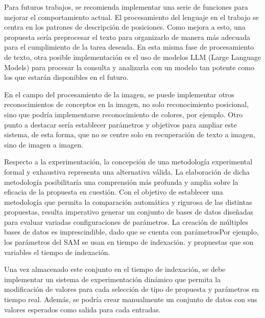 \begin{recomendations}
    Para futuros trabajos, se recomienda implementar una serie de funciones para mejorar el comportamiento actual. El procesamiento del lenguaje en el trabajo se centra en los patrones de descripción de posiciones. Como mejora a esto, una propuesta sería preprocesar el texto para organizarlo de manera más adecuada para el cumplimiento de la tarea deseada. En esta misma fase de procesamiento de texto, otra posible implementación es el uso de modelos LLM (Large Language Models) para procesar la consulta y analizarla con un modelo tan potente como los que estarán disponibles en el futuro.
    
    En el campo del procesamiento de la imagen, se puede implementar otros reconocimientos de conceptos en la imagen, no solo reconocimiento posicional, sino que podría implementarse reconocimiento de colores, por ejemplo. Otro punto a destacar sería establecer parámetros y objetivos para ampliar este sistema, de esta forma, que no se centre solo en recuperación de texto a imagen, sino de imagen a imagen.
        
    Respecto a la experimentación, la concepción de una metodología experimental formal y exhaustiva representa una alternativa v\'alida. La elaboración de dicha metodología posibilitaría una comprensión más profunda y amplia sobre la eficacia de la propuesta en cuestión. Con el objetivo de establecer una metodología que permita la comparación automática y rigurosa de las distintas propuestas, resulta imperativo generar un conjunto de bases de datos diseñadas para evaluar variadas configuraciones de parámetros. La creación de múltiples bases de datos es imprescindible, dado que se cuenta con parámetros{Por ejemplo, los par\'ametros del SAM se usan en tiempo de indexación.} y propuestas que son variables el tiempo de indexación.

    Una vez almacenado este conjunto en el tiempo de indexación, se debe implementar un sistema de experimentación dinámico que permita la modificación de valores para cada selección de tipo de propuesta y parámetros en tiempo real. Además, se podría crear manualmente un conjunto de datos con sus valores esperados como salida para cada entradas.

\end{recomendations}
    